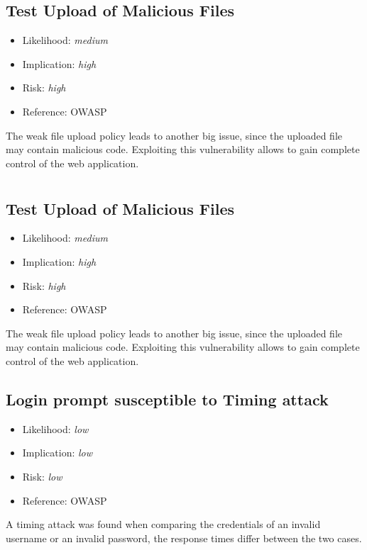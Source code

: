 \subsection{Test Upload of Malicious Files} \label{over:malicious}
\begin{itemize}
	\item Likelihood: \textit{medium}
	\item Implication: \textit{high}
	\item Risk: \textit{high}
	\item Reference: OWASP 
\end{itemize}
The weak file upload policy leads to another big issue, since the uploaded file may contain malicious code. Exploiting this vulnerability allows to gain complete control of the web application.

\section{\gnb}
\subsection{Test Upload of Malicious Files} \label{over:maliciousgnb}
\begin{itemize}
	\item Likelihood: \textit{medium}
	\item Implication: \textit{high}
	\item Risk: \textit{high}
	\item Reference: OWASP 
\end{itemize}
The weak file upload policy leads to another big issue, since the uploaded file may contain malicious code. Exploiting this vulnerability allows to gain complete control of the web application.

\subsection{Login prompt susceptible to Timing attack} \label{over:timeattack}
\begin{itemize}
	\item Likelihood: \textit{low}
	\item Implication: \textit{low}
	\item Risk: \textit{low}
	\item Reference: OWASP 
\end{itemize}
A timing attack was found when comparing the credentials of an invalid username or an invalid password, the response times differ between the two cases.

